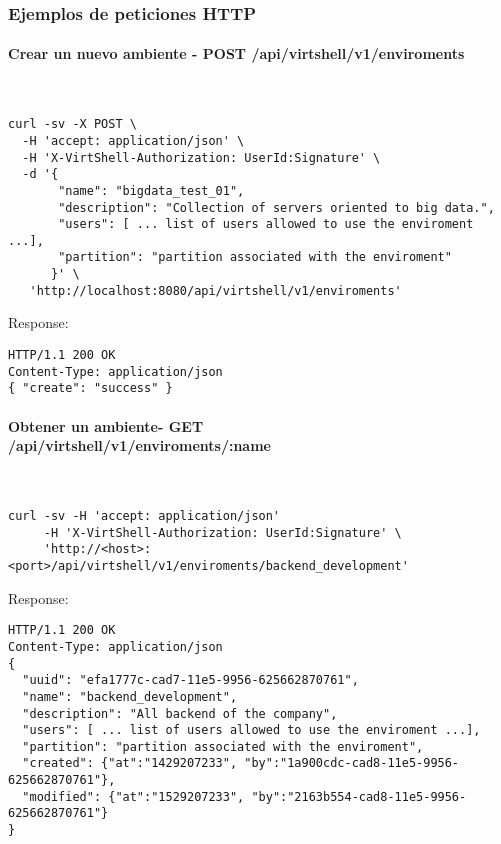 \subsubsection{Ejemplos de peticiones HTTP}

\paragraph{Crear un nuevo ambiente - POST /api/virtshell/v1/enviroments} ~\\

\begin{lstlisting}[style=json]
curl -sv -X POST \
  -H 'accept: application/json' \
  -H 'X-VirtShell-Authorization: UserId:Signature' \
  -d '{
       "name": "bigdata_test_01",
       "description": "Collection of servers oriented to big data.", 
       "users": [ ... list of users allowed to use the enviroment ...],
       "partition": "partition associated with the enviroment"
      }' \
   'http://localhost:8080/api/virtshell/v1/enviroments'
\end{lstlisting}

Response:

\begin{lstlisting}[style=json]
HTTP/1.1 200 OK
Content-Type: application/json
{ "create": "success" }
\end{lstlisting}

\paragraph{Obtener un ambiente- GET \\ /api/virtshell/v1/enviroments/:name} ~\\

\begin{lstlisting}[style=json]
curl -sv -H 'accept: application/json' 
     -H 'X-VirtShell-Authorization: UserId:Signature' \ 
     'http://<host>:<port>/api/virtshell/v1/enviroments/backend_development'
\end{lstlisting}

Response:

\begin{lstlisting}[style=json]
HTTP/1.1 200 OK
Content-Type: application/json
{
  "uuid": "efa1777c-cad7-11e5-9956-625662870761",
  "name": "backend_development",
  "description": "All backend of the company", 
  "users": [ ... list of users allowed to use the enviroment ...],
  "partition": "partition associated with the enviroment",
  "created": {"at":"1429207233", "by":"1a900cdc-cad8-11e5-9956-625662870761"},
  "modified": {"at":"1529207233", "by":"2163b554-cad8-11e5-9956-625662870761"}
}
\end{lstlisting}

